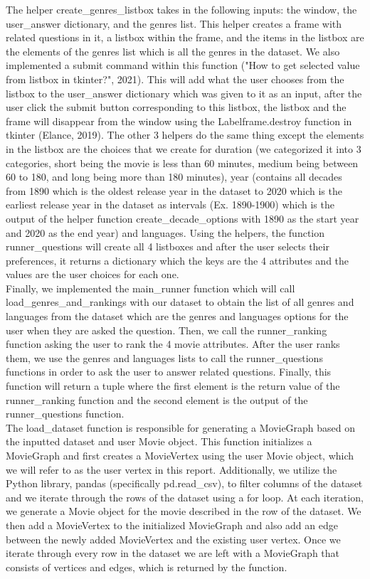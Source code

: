 \documentclass[fontsize=11pt]{article}
\begin{document}
The helper create\_genres\_listbox takes in the following inputs: the window, the user\_answer dictionary, and the genres list. This helper creates a frame with related questions in it, a listbox within the frame, and the items in the listbox are the elements of the genres list which is all the genres in the dataset. We also implemented a submit command within this function ("How to get selected value from listbox in tkinter?", 2021). This will add what the user chooses from the listbox to the user\_answer dictionary which was given to it as an input, after the user click the submit button corresponding to this listbox, the listbox and the frame will disappear from the window using the Labelframe.destroy function in tkinter (Elance, 2019). The other 3 helpers do the same thing except the elements in the listbox are the choices that we create for duration (we categorized it into 3 categories, short being the movie is less than 60 minutes, medium being between 60 to 180, and long being more than 180 minutes), year (contains all decades from 1890 which is the oldest release year in the dataset to 2020 which is the earliest release year in the dataset as intervals (Ex. 1890-1900) which is the output of the helper function create\_decade\_options with 1890 as the start year and 2020 as the end year) and languages. Using the helpers, the function runner\_questions will create all 4 listboxes and after the user selects their preferences, it returns a dictionary which the keys are the 4 attributes and the values are the user choices for each one. \\


Finally, we implemented the main\_runner function which will call load\_genres\_and\_rankings with our dataset to obtain the list of all genres and languages from the dataset which are the genres and languages options for the user when they are asked the question. Then, we call the runner\_ranking function asking the user to rank the 4 movie attributes. After the user ranks them, we use the genres and languages lists to call the runner\_questions functions in order to ask the user to answer related questions. Finally, this function will return a tuple where the first element is the return value of the runner\_ranking function and the second element is the output of the runner\_questions function.\\

The load\_dataset function is responsible for generating a MovieGraph based on the inputted dataset and user Movie object. This function initializes a MovieGraph and first creates a MovieVertex using the user Movie object, which we will refer to as the user vertex in this report. Additionally, we utilize the Python library, pandas (specifically pd.read\_csv), to filter columns of the dataset and we iterate through the rows of the dataset using a for loop. At each iteration, we generate a Movie object for the movie described in the row of the dataset. We then add a MovieVertex to the initialized MovieGraph and also add an edge between the newly added MovieVertex and the existing user vertex. Once we iterate through every row in the dataset we are left with a MovieGraph that consists of vertices and edges, which is returned by the function.\\
\end{document}
